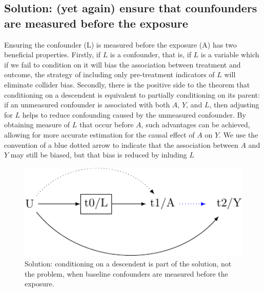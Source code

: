 \documentclass[
  singlecolumn]{report}
\begin{document}
\hypertarget{solution-yet-again-ensure-that-counfounders-are-measured-before-the-exposure}{%
\subsection{Solution: (yet again) ensure that counfounders are measured
before the
exposure}\label{solution-yet-again-ensure-that-counfounders-are-measured-before-the-exposure}}

Ensuring the confounder (L) is measured before the exposure (A) has two
beneficial properties. Firstly, if \(L\) is a confounder, that is, if
\(L\) is a variable which if we fail to condition on it will bias the
association between treatment and outcome, the strategy of including
only pre-treatment indicators of \(L\) will eliminate collider bias.
Secondly, there is the positive side to the theorem that conditioning on
a descendent is equivalent to partially conditioning on its parent: if
an unmeasured confounder is associated with both \(A\), \(Y\), and
\(L\), then adjusting for \(L\) helps to reduce confounding caused by
the unmeasured confounder. By obtaining measure of \(L\) that occur
before \(A\), such advantages can be achieved, allowing for more
accurate estimation for the causal effect of \(A\) on \(Y\). We use the
convention of a blue dotted arrow to indicate that the association
between \(A\) and \(Y\) may still be biased, but that bias is reduced by
inluding \(L\)

\begin{figure}

{\centering \includegraphics[width=1\textwidth,height=\textheight]{causal-dags_files/figure-pdf/fig-dag-descendent-solution-1.pdf}

}

\caption{\label{fig-dag-descendent-solution}Solution: conditioning on a
descendent is part of the solution, not the problem, when baseline
confounders are measured before the exposure.}

\end{figure}
\end{document}
